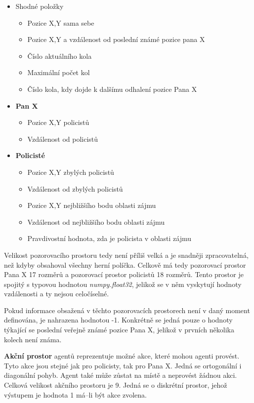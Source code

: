 \begin{itemize}
  \item Shodné položky
    \begin{itemize}
    \item Pozice X,Y sama sebe
    \item Pozice X,Y a vzdálenost od poslední známé pozice pana X
    \item Číslo aktuálního kola
    \item Maximální počet kol
    \item Číslo kola, kdy dojde k dalšímu odhalení pozice Pana X
  \end{itemize}
  \item \textbf{Pan X}
    \begin{itemize}
    \item Pozice X,Y policistů
    \item Vzdálenost od  policistů
  \end{itemize}
  \item \textbf{Policisté}
    \begin{itemize}
    \item Pozice X,Y zbylých policistů
    \item Vzdálenost od zbylých policistů
    \item Pozice X,Y nejbližšího bodu oblasti zájmu
    \item Vzdálenost od nejbližšího bodu oblasti zájmu
    \item Pravdivostní hodnota, zda je policista v oblasti zájmu
  \end{itemize}
\end{itemize}

Velikost pozorovacího prostoru tedy není příliš velká a je snadněji zpracovatelná, než kdyby obsahoval všechny herní políčka.
Celkově má tedy pozorovací prostor Pana X 17 rozměrů a pozorovací prostor policistů 18 rozměrů.
Tento prostor je spojitý s typovou hodnotou \emph{numpy.float32}, jelikož se v něm vyskytují hodnoty vzdálenosti a ty nejsou celočíselné.

Pokud informace obsažená v těchto pozorovacích prostorech není v daný moment definována, je nahrazena hodnotou -1.
Konkrétně se jedná pouze o hodnoty týkající se poslední veřejně známé pozice Pana X, jelikož v prvních několika kolech není známa.

\bigskip

\textbf{Akční prostor} agentů reprezentuje možné akce, které mohou agenti provést.
Tyto akce jsou stejné jak pro policisty, tak pro Pana X\@.
Jedná se ortogonální i diagonální pohyb.
Agent také může zůstat na místě a neprovést žádnou akci.
Celková velikost akčního prostoru je 9.
Jedná se o diskrétní prostor, jehož výstupem je hodnota 1 má--li být akce zvolena.

